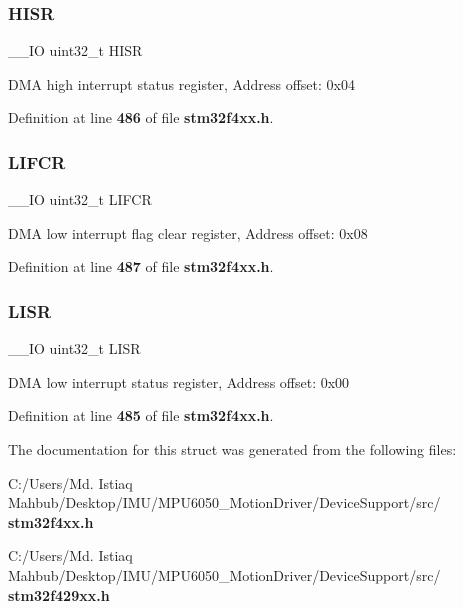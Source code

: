 \subsubsection{H\+I\+SR}
{\footnotesize\ttfamily \+\_\+\+\_\+\+IO uint32\+\_\+t H\+I\+SR}

D\+MA high interrupt status register, Address offset\+: 0x04 

Definition at line \textbf{ 486} of file \textbf{ stm32f4xx.\+h}.

\mbox{\label{structDMA__TypeDef_ac4f7bf4cb172024bfc940c00167cd04e}} 
\subsubsection{L\+I\+F\+CR}
{\footnotesize\ttfamily \+\_\+\+\_\+\+IO uint32\+\_\+t L\+I\+F\+CR}

D\+MA low interrupt flag clear register, Address offset\+: 0x08 

Definition at line \textbf{ 487} of file \textbf{ stm32f4xx.\+h}.

\mbox{\label{structDMA__TypeDef_a5cdef358e9e95b570358e1f6a3a7f492}} 
\subsubsection{L\+I\+SR}
{\footnotesize\ttfamily \+\_\+\+\_\+\+IO uint32\+\_\+t L\+I\+SR}

D\+MA low interrupt status register, Address offset\+: 0x00 

Definition at line \textbf{ 485} of file \textbf{ stm32f4xx.\+h}.



The documentation for this struct was generated from the following files\+:\begin{DoxyCompactItemize}
\item 
C\+:/\+Users/\+Md. Istiaq Mahbub/\+Desktop/\+I\+M\+U/\+M\+P\+U6050\+\_\+\+Motion\+Driver/\+Device\+Support/src/\textbf{ stm32f4xx.\+h}\item 
C\+:/\+Users/\+Md. Istiaq Mahbub/\+Desktop/\+I\+M\+U/\+M\+P\+U6050\+\_\+\+Motion\+Driver/\+Device\+Support/src/\textbf{ stm32f429xx.\+h}\end{DoxyCompactItemize}
